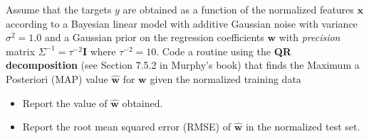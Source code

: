 \documentclass{harvardml}
\begin{document}
\begin{problem}[7pts]\label{prob:analytic_linear_model}
Assume that the targets $y$ are obtained as a function of the normalized
features $\mathbf{x}$ according to a Bayesian linear model with additive Gaussian noise with variance
$\sigma^2 = 1.0$ and a Gaussian prior on the regression coefficients $\mathbf{w}$
with \textit{precision} matrix $\Sigma^{-1} = \tau^{-2}\mathbf{I}$ where $\tau^{-2} = 10$. Code a routine
using the \textbf{QR decomposition} (see Section 7.5.2 in Murphy's book) that finds the Maximum a
Posteriori (MAP) value $\hat{\mathbf{w}}$ for $\mathbf{w}$ given the normalized
training data
\begin{itemize}
\item Report the value of $\hat{\mathbf{w}}$ obtained.
\item Report the root mean squared error (RMSE) of $\hat{\mathbf{w}}$ in the normalized test set.
\end{itemize}
\vspace{0.1cm}
\end{problem}
\end{document}
